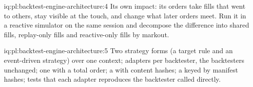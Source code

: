 \begin{solution}{iq:pl:backtest-engine-architecture:4}
Its own impact: its orders take fills that went to others, stay visible at the touch, and change what later orders meet. Run it in a
reactive simulator on the same session and decompose the difference into shared fills, replay-only fills and reactive-only fills by
markout.
\end{solution}

\begin{solution}{iq:pl:backtest-engine-architecture:5}
Two strategy forms (a target rule and an event-driven strategy) over one context; adapters per backtester, the backtesters unchanged; one
 with a total order; a  with content hashes; a  keyed by manifest hashes; tests that each adapter
reproduces the backtester called directly.
\end{solution}
